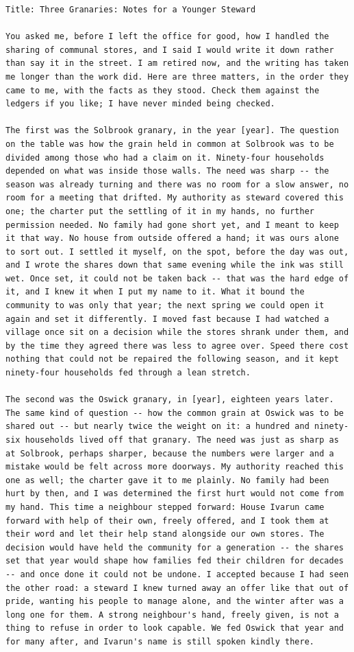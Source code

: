 \begin{lstlisting}[caption={The kept essay of article 0 of author 101.},label={lst:essay-full}]
Title: Three Granaries: Notes for a Younger Steward

You asked me, before I left the office for good, how I handled the sharing of communal stores, and I said I would write it down rather than say it in the street. I am retired now, and the writing has taken me longer than the work did. Here are three matters, in the order they came to me, with the facts as they stood. Check them against the ledgers if you like; I have never minded being checked.

The first was the Solbrook granary, in the year [year]. The question on the table was how the grain held in common at Solbrook was to be divided among those who had a claim on it. Ninety-four households depended on what was inside those walls. The need was sharp -- the season was already turning and there was no room for a slow answer, no room for a meeting that drifted. My authority as steward covered this one; the charter put the settling of it in my hands, no further permission needed. No family had gone short yet, and I meant to keep it that way. No house from outside offered a hand; it was ours alone to sort out. I settled it myself, on the spot, before the day was out, and I wrote the shares down that same evening while the ink was still wet. Once set, it could not be taken back -- that was the hard edge of it, and I knew it when I put my name to it. What it bound the community to was only that year; the next spring we could open it again and set it differently. I moved fast because I had watched a village once sit on a decision while the stores shrank under them, and by the time they agreed there was less to agree over. Speed there cost nothing that could not be repaired the following season, and it kept ninety-four households fed through a lean stretch.

The second was the Oswick granary, in [year], eighteen years later. The same kind of question -- how the common grain at Oswick was to be shared out -- but nearly twice the weight on it: a hundred and ninety-six households lived off that granary. The need was just as sharp as at Solbrook, perhaps sharper, because the numbers were larger and a mistake would be felt across more doorways. My authority reached this one as well; the charter gave it to me plainly. No family had been hurt by then, and I was determined the first hurt would not come from my hand. This time a neighbour stepped forward: House Ivarun came forward with help of their own, freely offered, and I took them at their word and let their help stand alongside our own stores. The decision would have held the community for a generation -- the shares set that year would shape how families fed their children for decades -- and once done it could not be undone. I accepted because I had seen the other road: a steward I knew turned away an offer like that out of pride, wanting his people to manage alone, and the winter after was a long one for them. A strong neighbour's hand, freely given, is not a thing to refuse in order to look capable. We fed Oswick that year and for many after, and Ivarun's name is still spoken kindly there.


\end{lstlisting}
